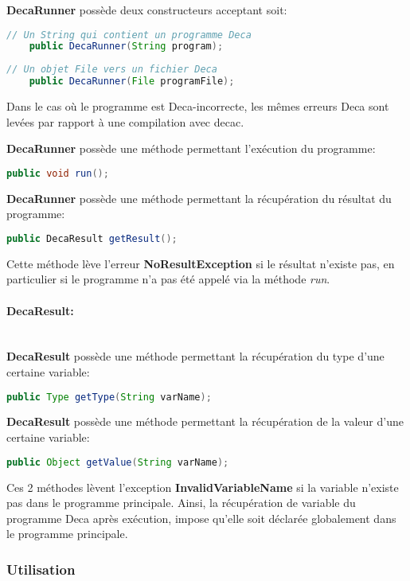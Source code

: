\documentclass[12pt, a4paper, one side]{article}
\newcommand{\paragraphln}[1]{\paragraph{#1}\mbox{}\\}
\begin{document}
        \textbf{DecaRunner} possède deux constructeurs acceptant soit:
\begin{lstlisting}[language=java]
    // Un String qui contient un programme Deca
    public DecaRunner(String program);
\end{lstlisting}
\begin{lstlisting}[language=java]
    // Un objet File vers un fichier Deca
    public DecaRunner(File programFile);
\end{lstlisting}

        Dans le cas où le programme est Deca-incorrecte, les mêmes erreurs Deca sont levées par rapport à une compilation avec decac.

        \textbf{DecaRunner} possède une méthode permettant l'exécution du programme:
\begin{lstlisting}[language=java]
    public void run();
\end{lstlisting}

\textbf{DecaRunner} possède une méthode permettant la récupération du résultat du programme:
\begin{lstlisting}[language=java]
    public DecaResult getResult();
\end{lstlisting}
Cette méthode lève l'erreur \textbf{NoResultException} si le résultat n'existe pas, en particulier si le programme n'a pas été appelé via la méthode \emph{run}.

        \paragraphln{DecaResult:}

        \textbf{DecaResult} possède une méthode permettant la récupération du type d'une certaine variable:
\begin{lstlisting}[language=java]
    public Type getType(String varName);
\end{lstlisting}

\textbf{DecaResult} possède une méthode permettant la récupération de la valeur d'une certaine variable:
\begin{lstlisting}[language=java]
    public Object getValue(String varName);
\end{lstlisting}
Ces 2 méthodes lèvent l'exception \textbf{InvalidVariableName} si la variable n'existe pas dans le programme principale.
Ainsi, la récupération de variable du programme Deca après exécution, impose qu'elle soit déclarée globalement dans le programme principale.
        \subsubsection{Utilisation}
\end{document}
